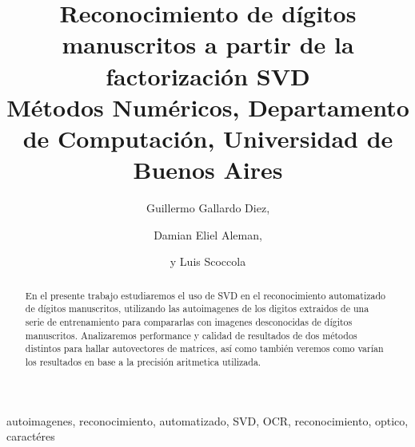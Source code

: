 \documentclass[%
	compressed,
	titlepage,
	narroweqnarray,
	inline,
	twoside,
	]{ieee}
\begin{document}
\title[Reconocimiento de d\'igitos manuscritos]{%
	Reconocimiento de d\'igitos manuscritos a partir de la factorizaci\'on SVD\\
{\small M\'etodos Num\'ericos, Departamento de Computaci\'on, Universidad de Buenos Aires}
}

\author[ALEMAN, G. DIEZ Y SCOCCOLA]{
Guillermo Gallardo Diez,\and{}Damian Eliel Aleman,\and{}y Luis Scoccola
}



\maketitle               
\tableofcontents

\newpage

\begin{abstract} 
	En el presente trabajo estudiaremos el uso de SVD en el reconocimiento 
	automatizado de d\'igitos manuscritos, utilizando las autoimagenes de 
	los digitos extraidos de una serie de entrenamiento para compararlas 
	con imagenes desconocidas de d\'igitos manuscritos.
	Analizaremos performance y calidad de resultados de dos m\'etodos
	distintos para hallar autovectores de matrices, as\'i como tambi\'en 
	veremos como var\'ian los resultados en base a la precisi\'on aritmetica 
	utilizada.
\end{abstract}

\begin{keywords}
	autoimagenes, reconocimiento, automatizado, SVD, OCR, reconocimiento, optico, caract\'eres
\end{keywords}


 








\end{document}
